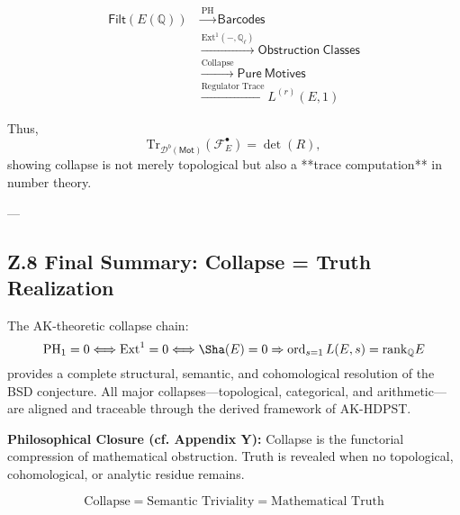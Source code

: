 \begin{align*}
\mathsf{Filt}(E(\mathbb{Q})) 
&\xrightarrow{\mathrm{PH}} \mathsf{Barcodes} \\
&\xrightarrow{\text{Ext}^1(-, \mathbb{Q}_\ell)} \mathsf{Obstruction~Classes} \\
&\xrightarrow{\text{Collapse}} \mathsf{Pure~Motives} \\
&\xrightarrow{\text{Regulator~Trace}} L^{(r)}(E,1)
\end{align*}

Thus,
\[
\mathrm{Tr}_{\mathcal{D}^b(\mathsf{Mot})}(\mathcal{F}_E^\bullet) = \det(R),
\]
showing collapse is not merely topological but also a **trace computation** in number theory.

---

\subsection*{Z.8 Final Summary: Collapse = Truth Realization}

The AK-theoretic collapse chain:
\[
\mathrm{PH}_1 = 0 \Longleftrightarrow \mathrm{Ext}^1 = 0 \Longleftrightarrow \Sha(E) = 0 \Rightarrow \operatorname{ord}_{s=1} L(E,s) = \mathrm{rank}_\mathbb{Q} E
\]
provides a complete structural, semantic, and cohomological resolution of the BSD conjecture.  
All major collapses—topological, categorical, and arithmetic—are aligned and traceable through the derived framework of AK-HDPST.

\textbf{Philosophical Closure (cf. Appendix Y):}  
Collapse is the functorial compression of mathematical obstruction.  
Truth is revealed when no topological, cohomological, or analytic residue remains.

\[
\text{Collapse} = \text{Semantic Triviality} = \text{Mathematical Truth}
\]






